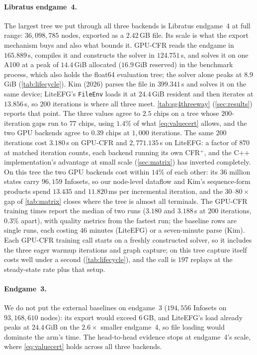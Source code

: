 \paragraph{Libratus endgame~4.}
The largest tree we put through all three backends is Libratus endgame~4 at full range:
$36{,}098{,}785$ nodes, exported as a $2.42$\,GB file. Its scale is what the export
mechanism buys and also what bounds it. GPU-CFR reads the endgame in $165.889$\,s,
compiles it and constructs the solver in $124.751$\,s, and solves it on one A100 at a
peak of $14.4$\,GiB allocated ($16.9$\,GiB reserved) in the benchmark process, which
also holds the float64 evaluation tree; the solver alone peaks at $8.9$\,GiB
(\cref{tab:lifecycle}). Kim (2026) parses the file in
$399.341$\,s and solves it on the same device; LiteEFG's
\texttt{FileEnv} loads it at $24.4$\,GiB resident and then iterates at
$13.856$\,s, so $200$ iterations is where all three meet. \cref{tab:sg4threeway}
(\cref{sec:results}) reports that point. The three values agree to $2.5$ chips on a
tree whose $200$-iteration gaps run to $77$ chips, using $1.4\%$ of what
\cref{eq:valuecert} allows, and the two GPU backends agree to $0.39$ chips at
$1{,}000$ iterations. The same $200$ iterations cost $3.180$\,s on GPU-CFR and
$2{,}771.135$\,s on LiteEFG: a factor of $870$ at matched iteration counts, each
backend running its own CFR$^{+}$, and the C++ implementation's advantage at small
scale (\cref{sec:matrix}) has inverted completely. On this tree the two GPU backends
cost within $14\%$ of each other: its $36$ million states carry $96{,}159$
Infosets, so our node-level dataflow and Kim's sequence-form products spend
$13.435$ and $11.820$\,ms per incremental iteration, and the $30$--$80\times$ gap of
\cref{tab:matrix} closes where the tree is almost all terminals. The GPU-CFR training times
report the median of two runs ($3.180$ and $3.188$\,s at $200$ iterations, $0.3\%$ apart),
with quality metrics from the fastest run; the baseline rows are single runs,
each costing $46$ minutes (LiteEFG) or a seven-minute parse (Kim). Each GPU-CFR
training call starts on a freshly constructed solver, so it includes the three eager
warmup iterations and graph capture; on this tree capture itself costs well under a
second (\cref{tab:lifecycle}), and the call is $197$ replays at the steady-state rate
plus that setup.

\paragraph{Endgame~3.}
We do not put the external baselines on endgame~3 ($194{,}556$ Infosets on
$93{,}168{,}610$ nodes): its
export would exceed $6$\,GB, and LiteEFG's load already peaks at $24.4$\,GiB on the
$2.6\times$ smaller endgame~4, so file loading would dominate the arm's time. The
head-to-head evidence stops at endgame~4's scale, where \cref{eq:valuecert} holds across
all three backends.
